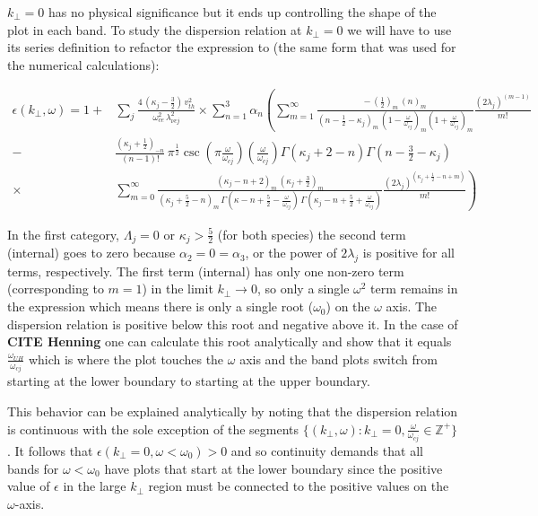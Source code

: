 \documentclass[12pt,a4paper]{article}
\begin{document}
    $k_\perp = 0$ has no physical significance but it ends up controlling the shape of the plot in each band. To study the dispersion relation at $k_\perp = 0$ we will have to use its series definition to refactor the expression to (the same form that was used for the numerical calculations):

    \begin{align}
        \epsilon(k_\perp, \omega) = 1 +& \sum_j \frac{4 \, (\kappa_j - \frac{3}{2}) \, v^2_{th}}{\omega^2_{ce} \, \lambda^2_{\nu c j}} \times \sum_{n = 1}^3 \alpha_n \left( \sum_{m = 1}^\infty \frac{ -\, (\frac{1}{2})_m \, (n)_m }{(n - \frac{1}{2} - \kappa_j)_m \, (1 - \frac{\omega}{\omega_{cj}})_m (1 + \frac{\omega}{\omega_{cj}})_m } \frac{(2 \lambda_j)^{(m - 1)}}{m!} \right. \\
        -& \left. \frac{(\kappa_j + \frac{1}{2})_{-n}}{(n - 1)!} \, \pi^{\frac{1}{2}} \csc\left(\pi \frac{\omega}{\omega_{cj}}\right) \left(\frac{\omega}{\omega_{cj}}\right) \Gamma(\kappa_j + 2 - n) \Gamma(n - \frac{3}{2} - \kappa_j) \right.\\
        \times& \left. \sum_{m = 0}^\infty \frac{(\kappa_j - n + 2)_m \, (\kappa_j + \frac{3}{2})_m}{(\kappa_j + \frac{5}{2} - n)_m \, \Gamma(\kappa - n + \frac{5}{2} - \frac{\omega}{\omega_{cj}}) \, \Gamma(\kappa_j - n + \frac{5}{2} + \frac{\omega}{\omega_{cj}})} \frac{(2 \lambda_j)^{(\kappa_j + \frac{1}{2} - n + m)}}{m!} \right)
    \end{align}

    In the first category, $\Lambda_j = 0$ or $\kappa_j > \frac{5}{2}$ (for both species) the second term (internal) goes to zero because $\alpha_2 = 0 = \alpha_3$, or the power of $2 \lambda_j$ is positive for all terms, respectively.
    The first term (internal) has only one non-zero term (corresponding to $m = 1$) in the limit $k_\perp \rightarrow 0$, so only a single $\omega^2$ term remains in the expression which means there is only a single root ($\omega_0$) on the $\omega$ axis.
    The dispersion relation is positive below this root and negative above it.
    In the case of \textbf{CITE Henning} one can calculate this root analytically and show that it equals $\frac{\omega_{UH}}{\omega_{cj}}$ which is where the plot touches the $\omega$ axis and the band plots switch from starting at the lower boundary to starting at the upper boundary.

    This behavior can be explained analytically by noting that the dispersion relation is continuous with the sole exception of the segments $\{(k_\perp, \omega): k_\perp = 0, \frac{\omega}{\omega_{cj}} \in \mathbb{Z}^+\}$.
    It follows that $\epsilon(k_\perp = 0, \omega < \omega_0) > 0$ and so continuity demands that all bands for $\omega < \omega_0$ have plots that start at the lower boundary since the positive value of $\epsilon$ in the large $k_\perp$ region must be connected to the positive values on the $\omega$-axis.
\end{document}
